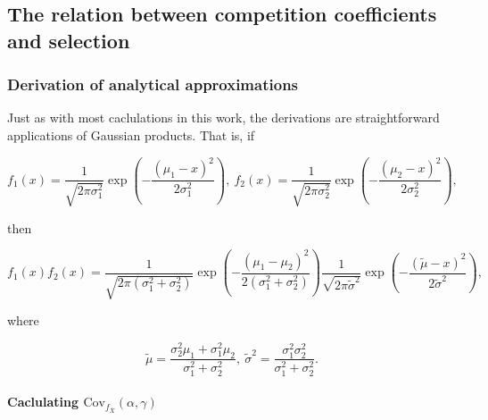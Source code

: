 \documentclass[]{article}
\let\oldparagraph\paragraph
\renewcommand{\paragraph}[1]{\oldparagraph{#1}\mbox{}}
\begin{document}
\hypertarget{the-relation-between-competition-coefficients-and-selection}{%
\subsection{\texorpdfstring{The relation between competition
coefficients and selection
\label{coef_grad_moms}}{The relation between competition coefficients and selection }}\label{the-relation-between-competition-coefficients-and-selection}}

\hypertarget{derivation-of-analytical-approximations}{%
\subsubsection{Derivation of analytical
approximations}\label{derivation-of-analytical-approximations}}

Just as with most caclulations in this work, the derivations are
straightforward applications of Gaussian products. That is, if

\begin{equation}
f_1(x)=\frac{1}{\sqrt{2\pi\sigma_1^2}}\exp\left(-\frac{(\mu_1-x)^2}{2\sigma_1^2}\right), \ f_2(x)=\frac{1}{\sqrt{2\pi\sigma_2^2}}\exp\left(-\frac{(\mu_2-x)^2}{2\sigma_2^2}\right),
\end{equation}

then

\begin{equation}
f_1(x)f_2(x)=\frac{1}{\sqrt{2\pi(\sigma_1^2+\sigma_2^2)}}\exp\left(-\frac{(\mu_1-\mu_2)^2}{2(\sigma_1^2+\sigma_2^2)}\right)\frac{1}{\sqrt{2\pi\tilde\sigma^2}}\exp\left(-\frac{(\tilde\mu-x)^2}{2\tilde\sigma^2}\right),
\end{equation}

where

\begin{equation}
\tilde\mu=\frac{\sigma_2^2\mu_1+\sigma_1^2\mu_2}{\sigma_1^2+\sigma_2^2}, \ \tilde\sigma^2=\frac{\sigma_1^2\sigma_2^2}{\sigma_1^2+\sigma_2^2}.
\end{equation}

\hypertarget{caclulating-mathrmcov_f_bar-xalphagamma}{%
\paragraph{\texorpdfstring{Caclulating
\(\mathrm{Cov}_{f_{\bar X}}(\alpha,\gamma)\)}{Caclulating \textbackslash{}mathrm\{Cov\}\_\{f\_\{\textbackslash{}bar X\}\}(\textbackslash{}alpha,\textbackslash{}gamma)}}\label{caclulating-mathrmcov_f_bar-xalphagamma}}
\end{document}
